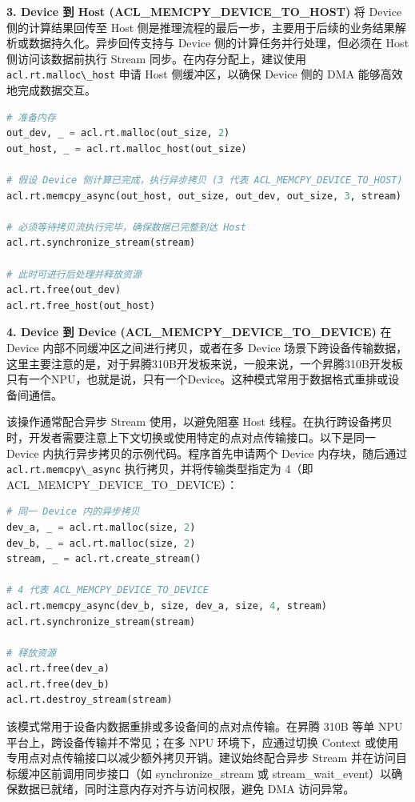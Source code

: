 \textbf{3. Device 到 Host (ACL\_MEMCPY\_DEVICE\_TO\_HOST)} 将 Device
侧的计算结果回传至 Host
侧是推理流程的最后一步，主要用于后续的业务结果解析或数据持久化。异步回传支持与
Device 侧的计算任务并行处理，但必须在 Host 侧访问该数据前执行 Stream
同步。在内存分配上，建议使用
\passthrough{\lstinline!acl.rt.malloc\_host!} 申请 Host 侧缓冲区，以确保
Device 侧的 DMA 能够高效地完成数据交互。

\begin{lstlisting}[language=Python]
# 准备内存
out_dev, _ = acl.rt.malloc(out_size, 2)
out_host, _ = acl.rt.malloc_host(out_size)

# 假设 Device 侧计算已完成，执行异步拷贝 (3 代表 ACL_MEMCPY_DEVICE_TO_HOST)
acl.rt.memcpy_async(out_host, out_size, out_dev, out_size, 3, stream)

# 必须等待拷贝流执行完毕，确保数据已完整到达 Host
acl.rt.synchronize_stream(stream)

# 此时可进行后处理并释放资源
acl.rt.free(out_dev)
acl.rt.free_host(out_host)
\end{lstlisting}

\textbf{4. Device 到 Device (ACL\_MEMCPY\_DEVICE\_TO\_DEVICE)} 在 Device
内部不同缓冲区之间进行拷贝，或者在多 Device
场景下跨设备传输数据，这里主要注意的是，对于昇腾310B开发板来说，一般来说，一个昇腾310B开发板只有一个NPU，也就是说，只有一个Device。这种模式常用于数据格式重排或设备间通信。

该操作通常配合异步 Stream 使用，以避免阻塞 Host
线程。在执行跨设备拷贝时，开发者需要注意上下文切换或使用特定的点对点传输接口。以下是同一
Device 内执行异步拷贝的示例代码。程序首先申请两个 Device
内存块，随后通过 \passthrough{\lstinline!acl.rt.memcpy\_async!}
执行拷贝，并将传输类型指定为 4（即 ACL\_MEMCPY\_DEVICE\_TO\_DEVICE）：

\begin{lstlisting}[language=Python]
# 同一 Device 内的异步拷贝
dev_a, _ = acl.rt.malloc(size, 2)
dev_b, _ = acl.rt.malloc(size, 2)
stream, _ = acl.rt.create_stream()

# 4 代表 ACL_MEMCPY_DEVICE_TO_DEVICE
acl.rt.memcpy_async(dev_b, size, dev_a, size, 4, stream)
acl.rt.synchronize_stream(stream)

# 释放资源
acl.rt.free(dev_a)
acl.rt.free(dev_b)
acl.rt.destroy_stream(stream)
\end{lstlisting}

该模式常用于设备内数据重排或多设备间的点对点传输。在昇腾 310B 等单 NPU
平台上，跨设备传输并不常见；在多 NPU 环境下，应通过切换 Context
或使用专用点对点传输接口以减少额外拷贝开销。建议始终配合异步 Stream
并在访问目标缓冲区前调用同步接口（如 synchronize\_stream 或
stream\_wait\_event）以确保数据已就绪，同时注意内存对齐与访问权限，避免
DMA 访问异常。

